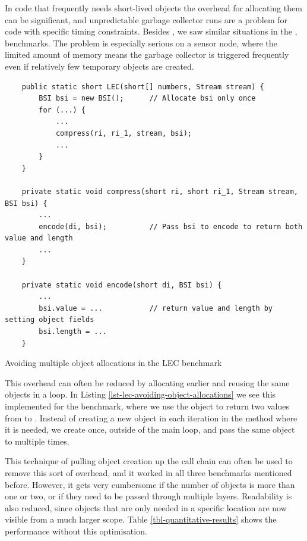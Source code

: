 In code that frequently needs short-lived objects the overhead for allocating them can be significant, and unpredictable garbage collector runs are a problem for code with specific timing constraints. Besides , we saw similar situations in the ,  benchmarks. The problem is especially serious on a sensor node, where the limited amount of memory means the garbage collector is triggered frequently even if relatively few temporary objects are created.

\begin{listing}
\begin{verbatim}
    public static short LEC(short[] numbers, Stream stream) {
        BSI bsi = new BSI();      // Allocate bsi only once
        for (...) {
            ...
            compress(ri, ri_1, stream, bsi);
            ...
        }
    }

    private static void compress(short ri, short ri_1, Stream stream, BSI bsi) {
        ...
        encode(di, bsi);          // Pass bsi to encode to return both value and length
        ...
    }

    private static void encode(short di, BSI bsi) {
        ...
        bsi.value = ...           // return value and length by setting object fields
        bsi.length = ...
    }
\end{verbatim}
\caption{Avoiding multiple object allocations in the LEC benchmark}
\label{lst-lec-avoiding-object-allocations}
\end{listing}

This overhead can often be reduced by allocating earlier and reusing the same objects in a loop. In Listing \ref{lst-lec-avoiding-object-allocations} we see this implemented for the  benchmark, where we use the  object to return two values from  to . Instead of creating a new object in each iteration in the  method where it is needed, we create  once, outside of the main loop, and pass the same object to  multiple times.

This technique of pulling object creation up the call chain can often be used to remove this sort of overhead, and it worked in all three benchmarks mentioned before. However, it gets very cumbersome if the number of objects is more than one or two, or if they need to be passed through multiple layers. Readability is also reduced, since objects that are only needed in a specific location are now visible from a much larger scope. Table \ref{tbl-quantitative-results} shows the performance without this optimisation.

